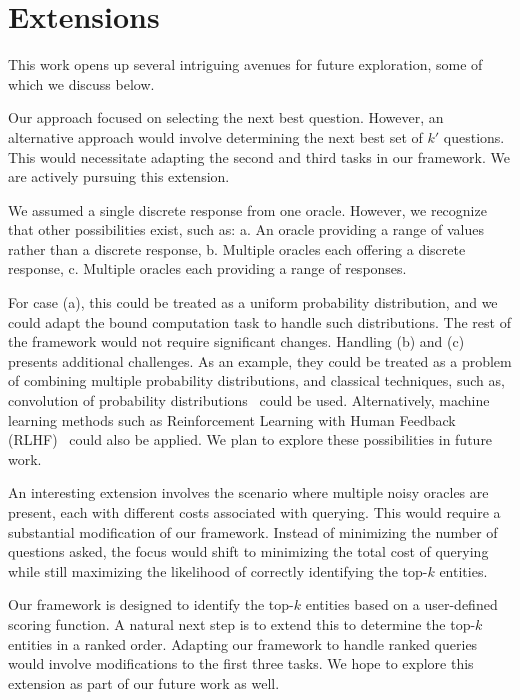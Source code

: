 \section{Extensions}\label{sec:ext}
This work opens up several intriguing avenues for future exploration, some of which we discuss below. 

Our approach focused on selecting the next best question. However, an alternative approach would involve determining the next best set of $k'$ questions. This would necessitate adapting the second and third tasks in our framework. We are actively pursuing this extension.

We assumed a single discrete response from one oracle. However, we recognize that other possibilities exist, such as:
a. An oracle providing a range of values rather than a discrete response,
b. Multiple oracles each offering a discrete response,
c. Multiple oracles each providing a range of responses.

For case (a), this could be treated as a uniform probability distribution, and we could adapt the bound computation task to handle such distributions. The rest of the framework would not require significant changes. Handling (b) and (c) presents additional challenges. As an example, they could be treated as a problem of combining multiple probability distributions, and classical techniques, such as, convolution of probability distributions~\cite{olds1952note} could be used. Alternatively, machine learning methods such as Reinforcement Learning with Human Feedback (RLHF)~\cite{rlhf1, rlhf2, rlhf3, rlhf4, rlhf5} could also be applied. We plan to explore these possibilities in future work.

An interesting extension involves the scenario where multiple noisy oracles are present, each with different costs associated with querying. This would require a substantial modification of our framework. Instead of minimizing the number of questions asked, the focus would shift to minimizing the total cost of querying while still maximizing the likelihood of correctly identifying the top-$k$ entities.

Our framework is designed to identify the top-$k$ entities based on a user-defined scoring function. A natural next step is to extend this to determine the top-$k$ entities in a ranked order. Adapting our framework to handle ranked queries would involve modifications to the first three tasks. We hope to explore this extension as part of our future work as well.
